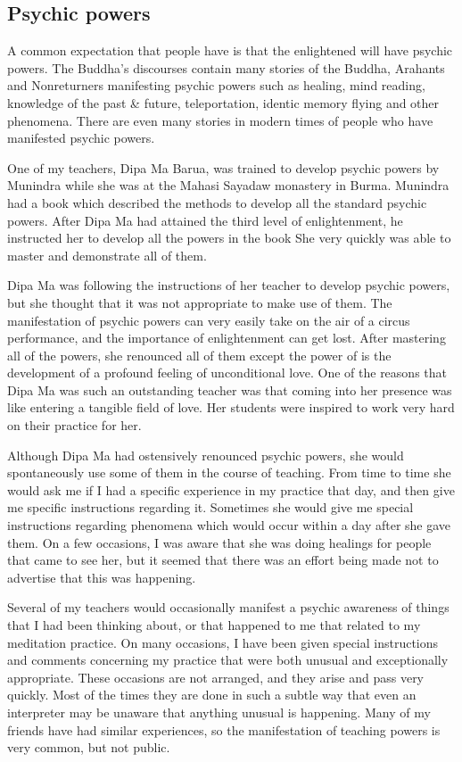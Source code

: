 \documentclass[a5paper,10pt,english]{book}
\begin{document}
\subsection{Psychic powers}
\label{\detokenize{saints:psychic-powers}}
\sphinxAtStartPar
A common expectation that people have is that the enlightened will have
psychic powers. The Buddha’s discourses contain many stories of the
Buddha, Arahants and Non\sphinxhyphen{}returners manifesting psychic powers such as
healing, mind reading, knowledge of the past \& future, teleportation,
identic memory flying and other phenomena. There are even many stories
in modern times of people who have manifested psychic powers.

\sphinxAtStartPar
One of my teachers, Dipa Ma Barua, was trained to develop psychic powers
by Munindra while she was at the Mahasi Sayadaw monastery in Burma.
Munindra had a book which described the methods to develop all the
standard psychic powers. After Dipa Ma had attained the third level of
enlightenment, he instructed her to develop all the powers in the book
She very quickly was able to master and demonstrate all of them.

\sphinxAtStartPar
Dipa Ma was following the instructions of her teacher to develop psychic
powers, but she thought that it was not appropriate to make use of them.
The manifestation of psychic powers can very easily take on the air of a
circus performance, and the importance of enlightenment can get lost.
After mastering all of the powers, she renounced all of them except the
power of  is the development of a profound feeling of
unconditional love. One of the reasons that Dipa Ma was such an
outstanding teacher was that coming into her presence was like entering
a tangible field of love. Her students were inspired to work very hard
on their practice for her.

\sphinxAtStartPar
Although Dipa Ma had ostensively renounced psychic powers, she would
spontaneously use some of them in the course of teaching. From time to
time she would ask me if I had a specific experience in my practice that
day, and then give me specific instructions regarding it. Sometimes she
would give me special instructions regarding phenomena which would occur
within a day after she gave them. On a few occasions, I was aware that
she was doing healings for people that came to see her, but it seemed
that there was an effort being made not to advertise that this was
happening.

\sphinxAtStartPar
Several of my teachers would occasionally manifest a psychic awareness
of things that I had been thinking about, or that happened to me that
related to my meditation practice. On many occasions, I have been given
special instructions and comments concerning my practice that were both
unusual and exceptionally appropriate. These occasions are not arranged,
and they arise and pass very quickly. Most of the times they are done in
such a subtle way that even an interpreter may be unaware that anything
unusual is happening. Many of my friends have had similar experiences,
so the manifestation of teaching powers is very common, but not public.
\end{document}
